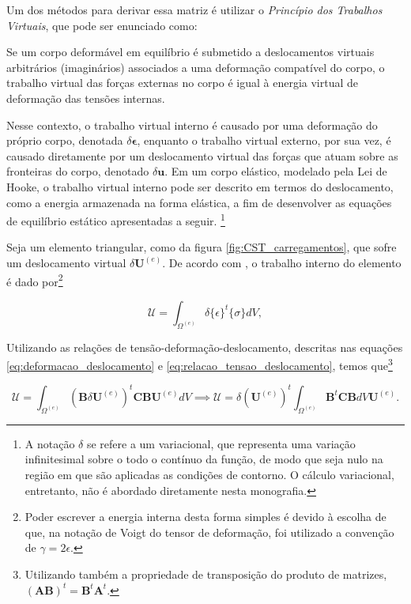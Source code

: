 Um dos métodos para derivar essa matriz é utilizar o \emph{Princípio dos Trabalhos Virtuais}, que pode ser enunciado como:

\begin{citacao}
    Se um corpo deformável em equilíbrio é submetido a deslocamentos virtuais arbitrários (imaginários) associados a uma deformação compatível do corpo, o trabalho virtual das forças externas no corpo é igual à energia virtual de deformação das tensões internas. \cite[pág. 876, tradução livre]{LOGAN}
\end{citacao}

Nesse contexto, o trabalho virtual interno é causado por uma deformação do próprio corpo, denotada $\delta \bm{\epsilon}$, enquanto o trabalho virtual externo, por sua vez, é causado diretamente por um deslocamento virtual das forças que atuam sobre as fronteiras do corpo, denotado $\delta \bm{u}$. Em um corpo elástico, modelado pela Lei de Hooke, o trabalho virtual interno pode ser descrito em termos do deslocamento, como a energia armazenada na forma elástica, a fim de desenvolver as equações de equilíbrio estático apresentadas a seguir. \footnote{A notação $\delta$ se refere a um variacional, que representa uma variação infinitesimal sobre o todo o contínuo da função, de modo que seja nulo na região em que são aplicadas as condições de contorno. O cálculo variacional, entretanto, não é abordado diretamente nesta monografia.}


Seja um elemento triangular, como da figura \ref{fig:CST_carregamentos}, que sofre um deslocamento virtual $\delta \bm{U}^{(e)}$. De acordo com , o trabalho interno do elemento é dado por\footnote{Poder escrever a energia interna desta forma simples é devido à escolha de que, na notação de Voigt do tensor de deformação, foi utilizado a convenção de $\gamma = 2 \epsilon$.}

\begin{equation}
    \mathcal{U} = \int_{\Omega^{(e)}} \delta \{\epsilon\}^t \{\sigma\} dV,
\end{equation}

Utilizando as relações de tensão-deformação-deslocamento, descritas nas equações \ref{eq:deformacao_deslocamento} e \ref{eq:relacao_tensao_deslocamento}, temos que\footnote{Utilizando também a propriedade de transposição do produto de matrizes, $(\bm{A}\bm{B})^t = \bm{B}^t \bm{A}^t$.}

\begin{equation}
    \mathcal{U} = \int_{\Omega^{(e)}} (\bm{B} \delta \bm{U}^{(e)})^t \bm{C} \bm{B} \bm{U}^{(e)} dV
    \implies \mathcal{U} = \delta (\bm{U}^{(e)})^t \int_{\Omega^{(e)}} \bm{B}^t \bm{C} \bm{B} dV \bm{U}^{(e)}.
\end{equation}

